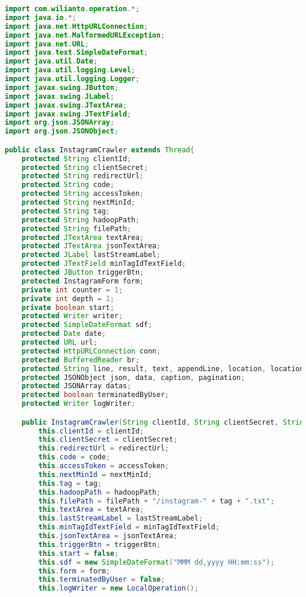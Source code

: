 \begin{lstlisting}[language=Java,basicstyle=\tiny,caption=InstagramCrawler.java]
import com.wilianto.operation.*;
import java.io.*;
import java.net.HttpURLConnection;
import java.net.MalformedURLException;
import java.net.URL;
import java.text.SimpleDateFormat;
import java.util.Date;
import java.util.logging.Level;
import java.util.logging.Logger;
import javax.swing.JButton;
import javax.swing.JLabel;
import javax.swing.JTextArea;
import javax.swing.JTextField;
import org.json.JSONArray;
import org.json.JSONObject;

public class InstagramCrawler extends Thread{
    protected String clientId;
    protected String clientSecret;
    protected String redirectUrl;
    protected String code; 
    protected String accessToken;
    protected String nextMinId;
    protected String tag;
    protected String hadoopPath;
    protected String filePath;
    protected JTextArea textArea;
    protected JTextArea jsonTextArea;
    protected JLabel lastStreamLabel;
    protected JTextField minTagIdTextField;
    protected JButton triggerBtn;
    protected InstagramForm form;
    private int counter = 1;
    private int depth = 1;
    private boolean start;
    protected Writer writer;
    protected SimpleDateFormat sdf;    
    protected Date date;
    protected URL url;
    protected HttpURLConnection conn;
    protected BufferedReader br;
    protected String line, result, text, appendLine, location, locationName, nextUrl;
    protected JSONObject json, data, caption, pagination;
    protected JSONArray datas;
    protected boolean terminatedByUser;
    protected Writer logWriter;

    public InstagramCrawler(String clientId, String clientSecret, String redirectUrl, String code, String nextMinId, String tag, String hadoopPath, String filePath, JTextArea textArea, JLabel lastStreamLabel, JTextField minTagIdTextField, JTextArea jsonTextArea, JButton triggerBtn, InstagramForm form) {
        this.clientId = clientId;
        this.clientSecret = clientSecret;
        this.redirectUrl = redirectUrl;
        this.code = code;
        this.accessToken = accessToken;
        this.nextMinId = nextMinId;
        this.tag = tag;
        this.hadoopPath = hadoopPath;
        this.filePath = filePath + "/instagram-" + tag + ".txt";
        this.textArea = textArea;
        this.lastStreamLabel = lastStreamLabel;
        this.minTagIdTextField = minTagIdTextField;
        this.jsonTextArea = jsonTextArea;
        this.triggerBtn = triggerBtn;
        this.start = false;
        this.sdf = new SimpleDateFormat("MMM dd,yyyy HH:mm:ss");
        this.form = form;
        this.terminatedByUser = false;
        this.logWriter = new LocalOperation();
        

\end{lstlisting}

